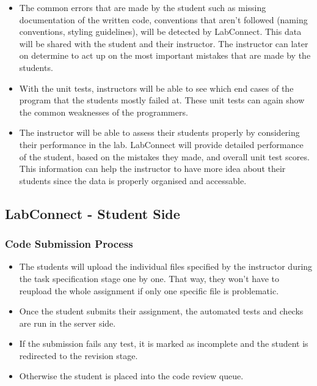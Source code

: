 \documentclass[a4paper, 12pt]{article}
\begin{document}
    \begin{itemize}
        \item The common errors that are made by the student such as missing documentation
        of the written code, conventions that aren't followed (naming conventions, styling
        guidelines), will be detected by LabConnect. This data will be shared with the student
        and their instructor. The instructor can later on determine to act up on the most
        important mistakes that are made by the students.
        \item With the unit tests, instructors will be able to see which end cases of the program
        that the students mostly failed at. These unit tests can again show the common weaknesses
        of the programmers.
        \item The instructor will be able to assess their students properly by considering their
        performance in the lab. LabConnect will provide detailed performance of the student,
        based on the mistakes they made, and overall unit test scores. This information can help
        the instructor to have more idea about their students since the data is properly organised
        and accessable.
    \end{itemize}

    \subsection{LabConnect - Student Side}

    \subsubsection{Code Submission Process}

    \begin{itemize}
      \item The students will upload the individual files specified by the instructor during the task specification
      stage one by one. That way, they won't have to reupload the whole assignment if only one specific file is problematic.
      \item Once the student submits their assignment, the automated tests and checks are run in the server side.
      \item If the submission fails any test, it is marked as incomplete and the student is redirected to the revision stage.
      \item Otherwise the student is placed into the code review queue.
    \end{itemize}
\end{document}
